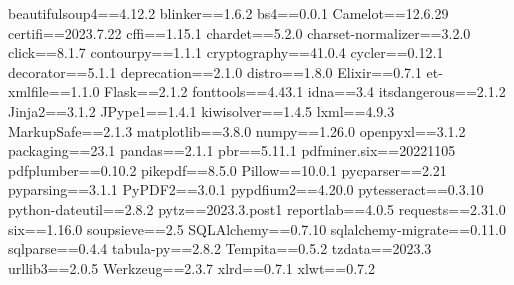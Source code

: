 beautifulsoup4==4.12.2
blinker==1.6.2
bs4==0.0.1
Camelot==12.6.29
certifi==2023.7.22
cffi==1.15.1
chardet==5.2.0
charset-normalizer==3.2.0
click==8.1.7
contourpy==1.1.1
cryptography==41.0.4
cycler==0.12.1
decorator==5.1.1
deprecation==2.1.0
distro==1.8.0
Elixir==0.7.1
et-xmlfile==1.1.0
Flask==2.1.2
fonttools==4.43.1
idna==3.4
itsdangerous==2.1.2
Jinja2==3.1.2
JPype1==1.4.1
kiwisolver==1.4.5
lxml==4.9.3
MarkupSafe==2.1.3
matplotlib==3.8.0
numpy==1.26.0
openpyxl==3.1.2
packaging==23.1
pandas==2.1.1
pbr==5.11.1
pdfminer.six==20221105
pdfplumber==0.10.2
pikepdf==8.5.0
Pillow==10.0.1
pycparser==2.21
pyparsing==3.1.1
PyPDF2==3.0.1
pypdfium2==4.20.0
pytesseract==0.3.10
python-dateutil==2.8.2
pytz==2023.3.post1
reportlab==4.0.5
requests==2.31.0
six==1.16.0
soupsieve==2.5
SQLAlchemy==0.7.10
sqlalchemy-migrate==0.11.0
sqlparse==0.4.4
tabula-py==2.8.2
Tempita==0.5.2
tzdata==2023.3
urllib3==2.0.5
Werkzeug==2.3.7
xlrd==0.7.1
xlwt==0.7.2
